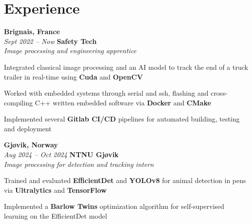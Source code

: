 
    \section{Experience}
        \begin{twocolentry}{
			\textbf{Brignais, France} \\
			\textit{Sept 2022 – Now}
            }{
            \textbf{Safety Tech} \\
            \textit{Image processing and engineering apprentice}
            }
        \end{twocolentry}

        \begin{onecolentry}
            \begin{highlights}
				\item Integrated classical image processing and an AI model to track the end of a truck trailer in real-time using \textbf{Cuda} and \textbf{OpenCV}
				\item Worked with embedded systems through serial and ssh, flashing and cross-compiling C++ written embedded software via \textbf{Docker} and \textbf{CMake}
                \item Implemented several \textbf{Gitlab CI/CD} pipelines for automated building, testing and deployment
            \end{highlights}
        \end{onecolentry}

        \begin{twocolentry}{
			\textbf{Gjøvik, Norway} \\
			\textit{Aug 2024 – Oct 2024}
            }{
			\textbf{NTNU Gjøvik} \\
			\textit{Image processing for detection and tracking intern}
            }
        \end{twocolentry}

        \begin{onecolentry}
            \begin{highlights}
                \item Trained and evaluated \textbf{EfficientDet} and \textbf{YOLOv8} for animal detection in pens via \textbf{Ultralytics} and \textbf{TensorFlow}
                \item Implemented a \textbf{Barlow Twins} optimization algorithm for self-supervised learning on the EfficientDet model
            \end{highlights}
        \end{onecolentry}

